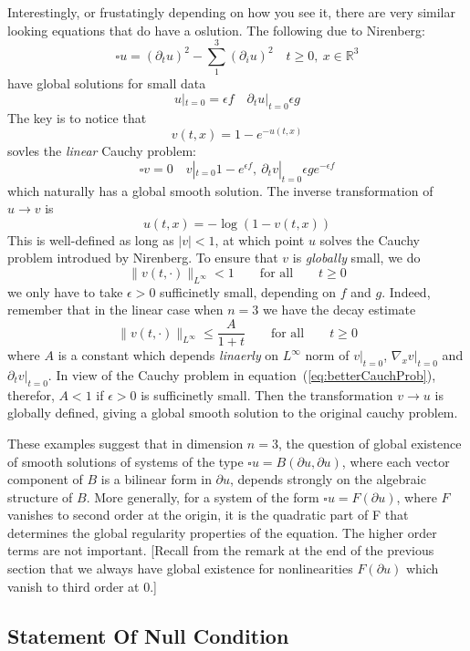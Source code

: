 \documentclass{book}
\newcommand{\R}{{\mathbb{R}}}
\newcommand{\rw}{\rightarrow}
\begin{document}
Interestingly, or frustatingly depending on how you see it, there are very similar looking equations that do have
a oslution. The following due to Nirenberg:
\[
	\square u = (  \partial_t u )^2 - \sum_1^3 (  \partial_i u )^2 \quad t \ge 0,\ x \in \R^3
\]
have global solutions for small data
\[
	u|_{t=0} = \epsilon f \quad  \partial_t u|_{t = 0} \epsilon g
\]
The key is to notice that
\[
	v(t,x) = 1- e^{-u(t,x)}
\]
sovles the \emph{linear} Cauchy problem:
\begin{equation}\label{eq:betterCauchProb}
  \square v = 0 \quad v|_{t=0} 1-e^{\epsilon f},\  \partial_t v|_{t=0} \epsilon ge^{-\epsilon f}
\end{equation}
which naturally has a global smooth solution. The inverse transformation of $u \rw v$ is
\[
	u(t,x) = -\log(1 - v(t,x))
\]
This is well-defined as long as $|v| < 1$, at which point $u$ solves the Cauchy problem introdued by Nirenberg. To
ensure that $v$ is \emph{globally} small, we do
\[
	\|v(t, \cdot)\|_{L^\infty} < 1 \qquad \text{for all} \qquad  t \ge 0
\]
we only have to take $\epsilon > 0$ sufficinetly small, depending on $f$ and $g$. Indeed, remember that in the
linear case when $n  =3$ we have the decay estimate
\[
	\|v(t, \cdot)\|_{L^\infty} \le \frac{A}{1+t} \qquad \text{for all} \qquad  t \ge 0
\]
where $A$ is a constant which depends \emph{linaerly} on $L^\infty$ norm of $v|_{t=0}$, $\nabla_x v|_{t=0}$ and
$  \partial_t v|_{t=0}$. In view of the Cauchy problem in equation~(\ref{eq:betterCauchProb}), therefor, $A < 1$
if $ \epsilon > 0$ is sufficinetly small. Then the transformation $v \rw u$ is globally defined, giving
a global smooth solution to the original cauchy problem.

These examples suggest that in dimension $n=3$, the question of global existence of smooth solutions of systems of the
type $\square u = B(  \partial u,  \partial u )$, where each vector component of $B$ is a bilinear form in $  \partial
u$, depends strongly on the algebraic structure of $B$. More generally, for a system of the form $\square u = F(
\partial u )$, where $F$ vanishes to second order at the origin, it is the quadratic part of F that determines the
global regularity properties of the equation. The higher order terms are not important. [Recall from the remark at the
end of the previous section that we always have global existence for nonlinearities $F(  \partial u )$ which vanish to
third order at $0$.]

\subsection{Statement Of Null Condition}
\end{document}
